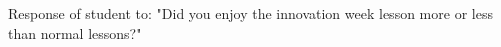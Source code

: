 Response of student to: "Did you enjoy the innovation week lesson more or less than normal lessons?"